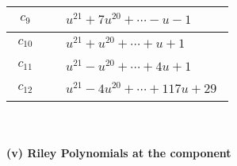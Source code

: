 \documentclass[1p]{elsarticle_modified}
\theoremstyle{definition}
\begin{document}
\begin{tabular}{m{50pt}|m{274pt}}
\hline $$\begin{aligned}c_{9}\end{aligned}$$&$\begin{aligned}
&u^{21}+7 u^{20}+\cdots- u-1
\end{aligned}$\\
\hline $$\begin{aligned}c_{10}\end{aligned}$$&$\begin{aligned}
&u^{21}+u^{20}+\cdots+u+1
\end{aligned}$\\
\hline $$\begin{aligned}c_{11}\end{aligned}$$&$\begin{aligned}
&u^{21}- u^{20}+\cdots+4 u+1
\end{aligned}$\\
\hline $$\begin{aligned}c_{12}\end{aligned}$$&$\begin{aligned}
&u^{21}-4 u^{20}+\cdots+117 u+29
\end{aligned}$\\
\hline
\end{tabular}\\~\\
\newpage\renewcommand{\arraystretch}{1}
\flushleft \textbf{(v) Riley Polynomials at the component}\newline \\
\end{document}
